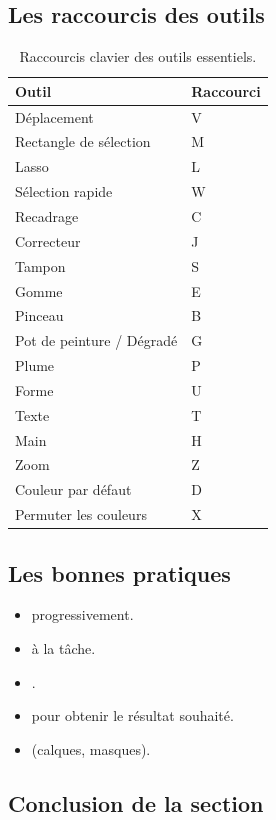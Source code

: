 \subsection{Les raccourcis des outils}

\begin{table}[h!]
\centering
\begin{tabular}{@{}ll@{}}
\toprule
\textbf{Outil} & \textbf{Raccourci} \\
\midrule
Déplacement & V \\
Rectangle de sélection & M \\
Lasso & L \\
Sélection rapide & W \\
Recadrage & C \\
Correcteur & J \\
Tampon & S \\
Gomme & E \\
Pinceau & B \\
Pot de peinture / Dégradé & G \\
Plume & P \\
Forme & U \\
Texte & T \\
Main & H \\
Zoom & Z \\
Couleur par défaut & D \\
Permuter les couleurs & X \\
\bottomrule
\end{tabular}
\caption{Raccourcis clavier des outils essentiels.}
\end{table}

\subsection{Les bonnes pratiques}

\begin{itemize}
    \item {} progressivement.
    \item {} à la tâche.
    \item {}.
    \item {} pour obtenir le résultat souhaité.
    \item {} (calques, masques).
\end{itemize}

\subsection*{Conclusion de la section}

